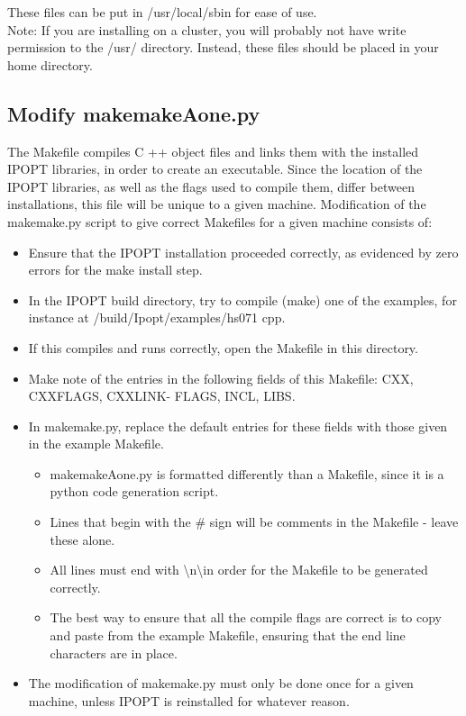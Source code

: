 \documentclass[11pt]{article}
\begin{document}
These files can be put in /usr/local/sbin for ease of use.
\vspace{12pt}
\\
Note: If you are installing on a cluster, you will probably not have write permission to the /usr/ directory. Instead, these files should be placed in your home directory.

\subsection*{Modify makemakeAone.py}
The Makefile compiles C ++ object files and links them with the installed IPOPT libraries, in order to
create an executable. Since the location of the IPOPT libraries, as well as the flags used to compile them,
differ between installations, this file will be unique to a given machine. Modification of the makemake.py
script to give correct Makefiles for a given machine consists of:
\begin{itemize}
\item Ensure that the IPOPT installation proceeded correctly, as evidenced by zero errors for the make install step.
\item In the IPOPT build directory, try to compile (make) one of the examples, for instance at
/build/Ipopt/examples/hs071 cpp.
\item If this compiles and runs correctly, open the Makefile in this directory.
\item Make note of the entries in the following fields of this Makefile: CXX, CXXFLAGS, CXXLINK-
FLAGS, INCL, LIBS.
\item In makemake.py, replace the default entries for these fields with those given in the example Makefile.
\begin{itemize}
\item makemakeAone.py is formatted differently than a Makefile, since it is a python code generation script.
\item Lines that begin with the \# sign will be comments in the Makefile - leave these alone.
\item All lines must end with \textbackslash n\textbackslash in order for the Makefile to be generated correctly.
\item The best way to ensure that all the compile flags are correct is to copy and paste from the
example Makefile, ensuring that the end line characters are in place.
\end{itemize}
\item The modification of makemake.py must only be done once for a given machine, unless IPOPT is
reinstalled for whatever reason.
\end{itemize}
\pagebreak
\end{document}
